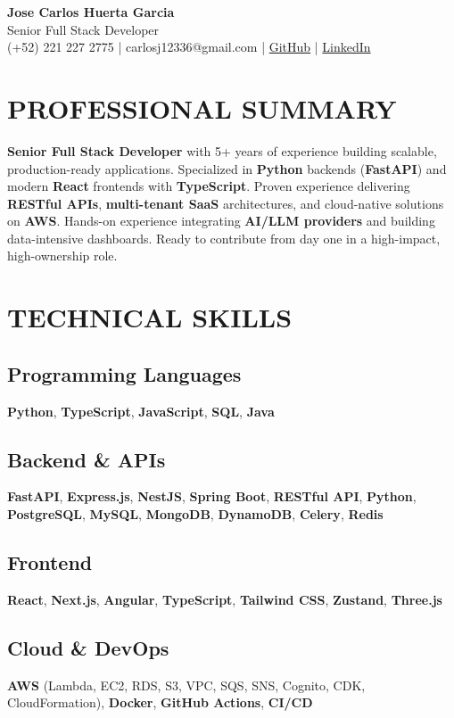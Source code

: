 \documentclass[a4paper,10pt]{article}
\newcommand{\kw}[1]{\textbf{\textcolor{keyword}{#1}}}
\newcommand{\tech}[1]{\textbf{\textcolor{tech}{#1}}}
\begin{document}
\begin{center}
{\bfseries\LARGE Jose Carlos Huerta Garcia} \\
Senior Full Stack Developer \\
(+52) 221 227 2775 | carlosj12336@gmail.com | \href{https://github.com/jcarloshg}{GitHub} | \href{https://www.linkedin.com/in/jose-carlos-huerta-garcia-773952212}{LinkedIn}
\end{center}

\section*{PROFESSIONAL SUMMARY}
\tech{Senior Full Stack Developer} with 5+ years of experience building scalable, production-ready applications. Specialized in \kw{Python} backends (\tech{FastAPI}) and modern \tech{React} frontends with \tech{TypeScript}. Proven experience delivering \kw{RESTful APIs}, \kw{multi-tenant SaaS} architectures, and cloud-native solutions on \tech{AWS}. Hands-on experience integrating \kw{AI/LLM providers} and building data-intensive dashboards. Ready to contribute from day one in a high-impact, high-ownership role.

\section*{TECHNICAL SKILLS}

\subsection*{Programming Languages}
\tech{Python}, \tech{TypeScript}, \tech{JavaScript}, \tech{SQL}, \tech{Java}

\subsection*{Backend \& APIs}
\tech{FastAPI}, \tech{Express.js}, \tech{NestJS}, \tech{Spring Boot}, \tech{RESTful API}, \tech{Python}, \tech{PostgreSQL}, \tech{MySQL}, \tech{MongoDB}, \tech{DynamoDB}, \tech{Celery}, \tech{Redis}

\subsection*{Frontend}
\tech{React}, \tech{Next.js}, \tech{Angular}, \tech{TypeScript}, \tech{Tailwind CSS}, \tech{Zustand}, \tech{Three.js}

\subsection*{Cloud \& DevOps}
\tech{AWS} (Lambda, EC2, RDS, S3, VPC, SQS, SNS, Cognito, CDK, CloudFormation), \tech{Docker}, \tech{GitHub Actions}, \tech{CI/CD}
\end{document}
